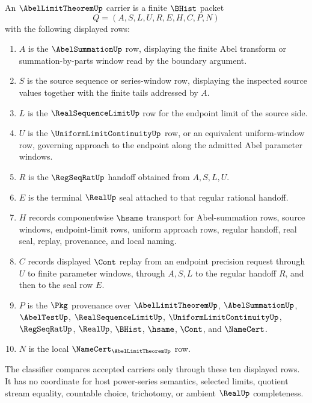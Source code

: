 \begin{definition}
\label{def:abel-limit-theorem-carrier}
An $\AbelLimitTheoremUp$ carrier is a finite $\BHist$ packet
$$
Q=(A,S,L,U,R,E,H,C,P,N)
$$
with the following displayed rows:
\begin{enumerate}
\item $A$ is the $\AbelSummationUp$ row, displaying the finite Abel transform or summation-by-parts window read by the boundary argument.
\item $S$ is the source sequence or series-window row, displaying the inspected source values together with the finite tails addressed by $A$.
\item $L$ is the $\RealSequenceLimitUp$ row for the endpoint limit of the source side.
\item $U$ is the $\UniformLimitContinuityUp$ row, or an equivalent uniform-window row, governing approach to the endpoint along the admitted Abel parameter windows.
\item $R$ is the $\RegSeqRatUp$ handoff obtained from $A,S,L,U$.
\item $E$ is the terminal $\RealUp$ seal attached to that regular rational handoff.
\item $H$ records componentwise $\hsame$ transport for Abel-summation rows, source windows, endpoint-limit rows, uniform approach rows, regular handoff, real seal, replay, provenance, and local naming.
\item $C$ records displayed $\Cont$ replay from an endpoint precision request through $U$ to finite parameter windows, through $A,S,L$ to the regular handoff $R$, and then to the seal row $E$.
\item $P$ is the $\Pkg$ provenance over $\AbelLimitTheoremUp$, $\AbelSummationUp$, $\AbelTestUp$, $\RealSequenceLimitUp$, $\UniformLimitContinuityUp$, $\RegSeqRatUp$, $\RealUp$, $\BHist$, $\hsame$, $\Cont$, and $\NameCert$.
\item $N$ is the local $\NameCert_{\AbelLimitTheoremUp}$ row.
\end{enumerate}
The classifier compares accepted carriers only through these ten displayed rows. It has no coordinate for host power-series semantics, selected limits, quotient stream equality, countable choice, trichotomy, or ambient $\RealUp$ completeness.
\end{definition}

